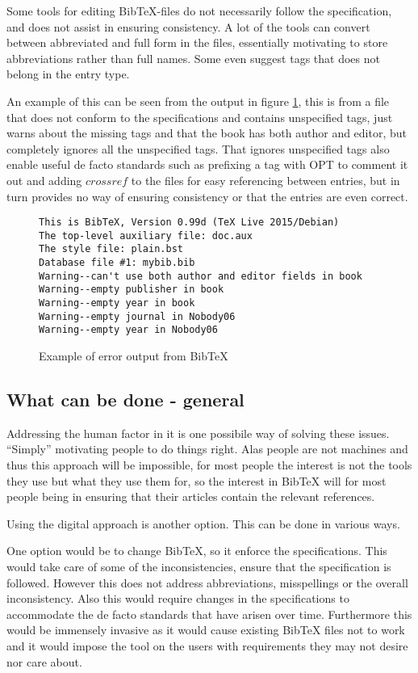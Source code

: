 Some tools for editing Bib{\TeX}-files do not necessarily follow the
specification, and does not assist in ensuring consistency.  A lot of
the tools can convert between abbreviated and full form in the files,
essentially motivating to store abbreviations rather than full names.
Some even suggest tags that does not belong in the entry type.



An example of this can be seen from the {\bibtex} output in figure
\ref{fig:bibtex_out}, this is from a file that does not conform to the
specifications and contains unspecified tags, {\bibtex} just warns
about the missing tags and that the book has both author and editor,
but completely ignores all the unspecified tags.  That {\bibtex}
ignores unspecified tags also enable useful de facto standards such as
prefixing a tag with OPT to comment it out and adding $crossref$ to
the files for easy referencing between entries, but in turn provides
no way of ensuring consistency or that the entries are even
correct. 

\begin{figure}[h]
  \centering
  \begin{verbatim}
This is BibTeX, Version 0.99d (TeX Live 2015/Debian)
The top-level auxiliary file: doc.aux
The style file: plain.bst
Database file #1: mybib.bib
Warning--can't use both author and editor fields in book
Warning--empty publisher in book
Warning--empty year in book
Warning--empty journal in Nobody06
Warning--empty year in Nobody06
\end{verbatim}
  \caption{Example of error output from Bib{\TeX}}
\label{fig:bibtex_out}
\end{figure}

\subsection{What can be done - general }
Addressing the human factor in it is one possibile way of solving
these issues.  ``Simply'' motivating people to do things right.  Alas
people are not machines and thus this approach will be impossible, for
most people the interest is not the tools they use but what they use
them for, so the interest in Bib{\TeX} will for most people being in
ensuring that their articles contain the relevant references.

Using the digital approach is another option.  This can be done in
various ways.

One option would be to change Bib{\TeX}, so it enforce the
specifications.  This would take care of some of the inconsistencies,
ensure that the specification is followed.  However this does not
address abbreviations, misspellings or the overall inconsistency.
Also this would require changes in the specifications to accommodate
the de facto standards that have arisen over time.  Furthermore this
would be immensely invasive as it would cause existing Bib{\TeX} files
not to work and it would impose the tool on the users with
requirements they may not desire nor care about.

